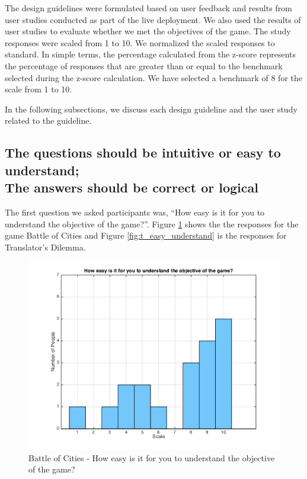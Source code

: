 \documentclass{sig-alternate}
\begin{document}
The design guidelines were formulated based on user feedback and results from user studies conducted as part of the live deployment. We also used the results of user studies to evaluate whether we met the objectives of the game. The study responses were scaled from 1 to 10. We normalized the scaled responses to standard\cite{laerd:standard_score}. In simple terms, the percentage calculated from the z-score represents the percentage of responses that are greater than or equal to the benchmark selected during the z-score calculation. We have selected a benchmark of 8 for the scale from 1 to 10.

In the following subsections, we discuss each design guideline and the user study related to the guideline.

\subsection{The questions should be intuitive or easy to understand;\\
The answers should be correct or logical}

The first question we asked participants was, ``How easy is it for you to understand the objective of the game?''. 
Figure \ref{fig:p_easy_understand} shows the the responses for the game Battle of Cities and Figure \ref{fig:t_easy_understand} is the responses for Translator's Dilemma. 

\begin{figure}
	\includegraphics[width=\linewidth]{p_easy_understand.png}
	\caption{Battle of Cities - How easy is it for you to understand the objective of the game?}
	\label{fig:p_easy_understand}
\end{figure}
\end{document}
